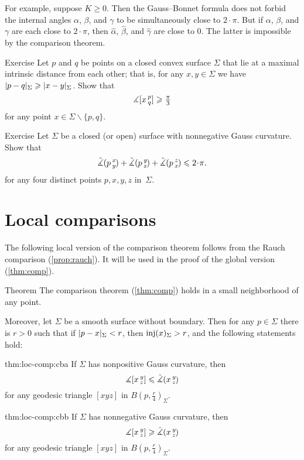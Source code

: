 For example, suppose $K\ge 0$.
Then the Gauss--Bonnet formula does not forbid the internal angles $\alpha$, $\beta$, and $\gamma$ to be simultaneously close to $2\cdot\pi$.
But if $\alpha$, $\beta$, and $\gamma$ are each close to $2\cdot\pi$, then $\hat\alpha$, $\hat\beta$, and $\hat\gamma$ are close to $0$.
The latter is impossible by the comparison theorem.

\begin{thm}{Exercise}\label{ex:diam-angle}
Let $p$ and $q$ be points on a closed convex surface $\Sigma$ that lie at a maximal intrinsic distance from each other;
that is, for any $x,y\in \Sigma$ we have $\dist{p}{q}\Sigma\z\ge\dist{x}{y}\Sigma$.
Show that 
\[\measuredangle[x\,{}^{p}_{q}]\geqslant \tfrac\pi3\]
for any point $x\in \Sigma\backslash\{p,q\}$.
\end{thm}

\begin{thm}{Exercise}\label{ex:sum=<2pi}
Let $\Sigma$ be a closed (or open) surface with nonnegative Gauss curvature.
Show that 
\[\modangle pxy+\modangle pyz+\modangle pzx\le2\cdot \pi.\]
for any four distinct points $p,x,y,z$ in~$\Sigma$.
\end{thm}

\section{Local comparisons}\label{sec:loc-comp}

The following local version of the comparison theorem follows from the Rauch comparison (\ref{prop:rauch}).
It will be used in the proof of the global version (\ref{thm:comp}).

\begin{thm}{Theorem}\label{thm:loc-comp}
The comparison theorem (\ref{thm:comp}) holds in a small neighborhood of any point.

Moreover, let $\Sigma$ be a smooth surface without boundary.
Then for any $p\in \Sigma$ there is $r>0$ such that if $\dist{p}{x}\Sigma<r$, then $\mathop{\rm inj}\nolimits(x)_\Sigma>r$, and the following statements hold:

\begin{subthm}{thm:loc-comp:cba}
If $\Sigma$ has nonpositive Gauss curvature, then 
\[\measuredangle[x\,{}^{y}_{z}]\leqslant\tilde\measuredangle(x\,{}^{y}_{z}\hspace{-0.2ex})\]
for any geodesic triangle $[xyz]$ in $B(p,\tfrac r4)_\Sigma$.
\end{subthm}

\begin{subthm}{thm:loc-comp:cbb}
If $\Sigma$ has nonnegative Gauss curvature, then 
\[\measuredangle[x\,{}^{y}_{z}]\geqslant\tilde\measuredangle(x\,{}^{y}_{z}\hspace{-0.2ex})\]
for any geodesic triangle $[xyz]$ in $B(p,\tfrac r4)_\Sigma$.
\end{subthm}

\end{thm}

